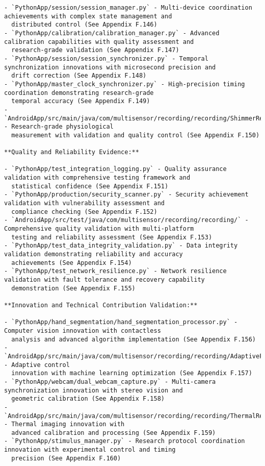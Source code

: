 \documentclass[12pt,a4paper]{report}
\begin{document}
\begin{verbatim}
- `PythonApp/session/session_manager.py` - Multi-device coordination achievements with complex state management and
  distributed control (See Appendix F.146)
- `PythonApp/calibration/calibration_manager.py` - Advanced calibration capabilities with quality assessment and
  research-grade validation (See Appendix F.147)
- `PythonApp/session/session_synchronizer.py` - Temporal synchronization innovations with microsecond precision and
  drift correction (See Appendix F.148)
- `PythonApp/master_clock_synchronizer.py` - High-precision timing coordination demonstrating research-grade
  temporal accuracy (See Appendix F.149)
- `AndroidApp/src/main/java/com/multisensor/recording/recording/ShimmerRecorder.kt` - Research-grade physiological
  measurement with validation and quality control (See Appendix F.150)

**Quality and Reliability Evidence:**

- `PythonApp/test_integration_logging.py` - Quality assurance validation with comprehensive testing framework and
  statistical confidence (See Appendix F.151)
- `PythonApp/production/security_scanner.py` - Security achievement validation with vulnerability assessment and
  compliance checking (See Appendix F.152)
- `AndroidApp/src/test/java/com/multisensor/recording/recording/` - Comprehensive quality validation with multi-platform
  testing and reliability assessment (See Appendix F.153)
- `PythonApp/test_data_integrity_validation.py` - Data integrity validation demonstrating reliability and accuracy
  achievements (See Appendix F.154)
- `PythonApp/test_network_resilience.py` - Network resilience validation with fault tolerance and recovery capability
  demonstration (See Appendix F.155)

**Innovation and Technical Contribution Validation:**

- `PythonApp/hand_segmentation/hand_segmentation_processor.py` - Computer vision innovation with contactless
  analysis and advanced algorithm implementation (See Appendix F.156)
- `AndroidApp/src/main/java/com/multisensor/recording/recording/AdaptiveFrameRateController.kt` - Adaptive control
  innovation with machine learning optimization (See Appendix F.157)
- `PythonApp/webcam/dual_webcam_capture.py` - Multi-camera synchronization innovation with stereo vision and
  geometric calibration (See Appendix F.158)
- `AndroidApp/src/main/java/com/multisensor/recording/recording/ThermalRecorder.kt` - Thermal imaging innovation with
  advanced calibration and processing (See Appendix F.159)
- `PythonApp/stimulus_manager.py` - Research protocol coordination innovation with experimental control and timing
  precision (See Appendix F.160)


\end{verbatim}
\end{document}
